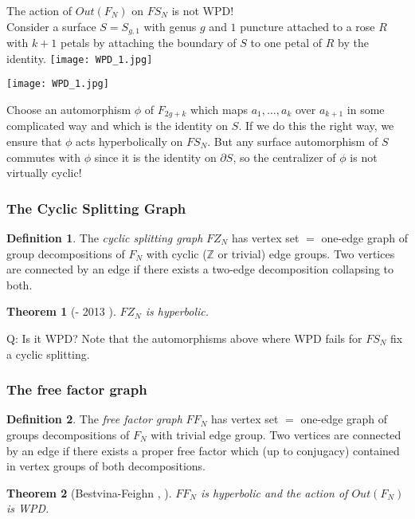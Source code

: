 \documentclass{beamer}
\theoremstyle{theorem}
\newtheorem{thm}{Theorem}
\theoremstyle{definition}
\newtheorem*{defin}{Definition}
\newcommand{\Z}{\ensuremath{\mathbb Z}}
\renewcommand{\-}{\ensuremath{^{-1}}}
\renewcommand{\>}{\ensuremath{\rightarrow}}
\newcommand{\del}{\partial}
\renewcommand{\(}{\langle}
\renewcommand{\)}{\rangle}
\begin{document}
\begin{frame}
The action of $Out(F_N)$ on $FS_N$ is not WPD! \\
\pause
Consider a surface $S = S_{g,1}$ with genus $g$ and $1$ puncture attached to a rose $R$ with $k+1$ petals by attaching the boundary of $S$ to one petal of $R$ by the identity.
\pause
\texttt{[image: WPD\_1.jpg]}
\end{frame}

\begin{frame}
\texttt{[image: WPD\_1.jpg]}

Choose an automorphism $\phi$ of $F_{2g + k}$ which maps $a_1, \ldots, a_k$ over $a_{k+1}$ in some complicated way and which is the identity on $S$. If we do this the right way, we ensure that $\phi$ acts hyperbolically on $FS_N$. But any surface automorphism of $S$ commutes with $\phi$ since it is the identity on $\del S$, so the centralizer of $\phi$ is not virtually cyclic!
\end{frame}

\begin{frame}
\frametitle{The Cyclic Splitting Graph}

\begin{defin}
The \emph{cyclic splitting graph} $FZ_N$ has vertex set $=$ one-edge graph of group decompositions of $F_N$ with cyclic ($\Z$ or trivial) edge groups. Two vertices are connected by an edge if there exists a two-edge decomposition collapsing to both.
\end{defin}
\pause
\begin{thm}[- 2013 \cite{Mann13}]
$FZ_N$ is hyperbolic.
\end{thm}
\pause
Q: Is it WPD?
\pause
Note that the automorphisms above where WPD fails for $FS_N$ fix a cyclic splitting.
\end{frame}

\begin{frame}
\frametitle{The free factor graph}
\begin{defin}
The \emph{free factor graph} $FF_N$ has vertex set $=$ one-edge graph of groups decompositions of $F_N$ with trivial edge group. Two vertices are connected by an edge if there exists a proper free factor which (up to conjugacy) contained in vertex groups of both decompositions.
\end{defin}
\pause
\begin{thm}[Bestvina-Feighn \cite{BF09}, \cite{BF11}]
$FF_N$ is hyperbolic and the action of $Out(F_N)$ is WPD.
\end{thm}
\end{frame}
\end{document}
